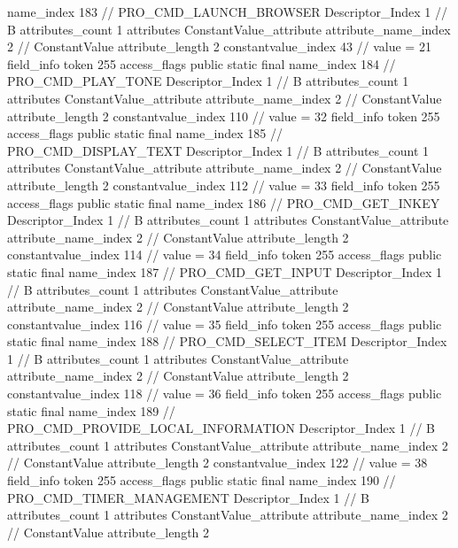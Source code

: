 {{{{{				name_index	183		// PRO_CMD_LAUNCH_BROWSER
				Descriptor_Index	1		// B
				attributes_count	1
				attributes {
				ConstantValue_attribute {
					attribute_name_index	2		// ConstantValue
					attribute_length	2
					constantvalue_index	43		// value = 21
				}
				}
			}
			field_info {
				token	255
				access_flags	public static final
				name_index	184		// PRO_CMD_PLAY_TONE
				Descriptor_Index	1		// B
				attributes_count	1
				attributes {
				ConstantValue_attribute {
					attribute_name_index	2		// ConstantValue
					attribute_length	2
					constantvalue_index	110		// value = 32
				}
				}
			}
			field_info {
				token	255
				access_flags	public static final
				name_index	185		// PRO_CMD_DISPLAY_TEXT
				Descriptor_Index	1		// B
				attributes_count	1
				attributes {
				ConstantValue_attribute {
					attribute_name_index	2		// ConstantValue
					attribute_length	2
					constantvalue_index	112		// value = 33
				}
				}
			}
			field_info {
				token	255
				access_flags	public static final
				name_index	186		// PRO_CMD_GET_INKEY
				Descriptor_Index	1		// B
				attributes_count	1
				attributes {
				ConstantValue_attribute {
					attribute_name_index	2		// ConstantValue
					attribute_length	2
					constantvalue_index	114		// value = 34
				}
				}
			}
			field_info {
				token	255
				access_flags	public static final
				name_index	187		// PRO_CMD_GET_INPUT
				Descriptor_Index	1		// B
				attributes_count	1
				attributes {
				ConstantValue_attribute {
					attribute_name_index	2		// ConstantValue
					attribute_length	2
					constantvalue_index	116		// value = 35
				}
				}
			}
			field_info {
				token	255
				access_flags	public static final
				name_index	188		// PRO_CMD_SELECT_ITEM
				Descriptor_Index	1		// B
				attributes_count	1
				attributes {
				ConstantValue_attribute {
					attribute_name_index	2		// ConstantValue
					attribute_length	2
					constantvalue_index	118		// value = 36
				}
				}
			}
			field_info {
				token	255
				access_flags	public static final
				name_index	189		// PRO_CMD_PROVIDE_LOCAL_INFORMATION
				Descriptor_Index	1		// B
				attributes_count	1
				attributes {
				ConstantValue_attribute {
					attribute_name_index	2		// ConstantValue
					attribute_length	2
					constantvalue_index	122		// value = 38
				}
				}
			}
			field_info {
				token	255
				access_flags	public static final
				name_index	190		// PRO_CMD_TIMER_MANAGEMENT
				Descriptor_Index	1		// B
				attributes_count	1
				attributes {
				ConstantValue_attribute {
					attribute_name_index	2		// ConstantValue
					attribute_length	2
}}}}}}}
